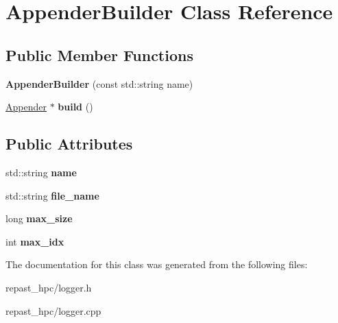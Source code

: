 \hypertarget{class_appender_builder}{\section{Appender\-Builder Class Reference}
\label{class_appender_builder}
}
\subsection*{Public Member Functions}
\begin{DoxyCompactItemize}
\item 
\hypertarget{class_appender_builder_a54ef7bfe2a4bc324957ef673be25ee82}{{\bfseries Appender\-Builder} (const std\-::string name)}\label{class_appender_builder_a54ef7bfe2a4bc324957ef673be25ee82}

\item 
\hypertarget{class_appender_builder_a8f0364cb9215568f44ce573cd8b9b3f0}{\hyperlink{class_appender}{Appender} $\ast$ {\bfseries build} ()}\label{class_appender_builder_a8f0364cb9215568f44ce573cd8b9b3f0}

\end{DoxyCompactItemize}
\subsection*{Public Attributes}
\begin{DoxyCompactItemize}
\item 
\hypertarget{class_appender_builder_ad6d1b5b3182271c7f4dd218b53f7a085}{std\-::string {\bfseries name}}\label{class_appender_builder_ad6d1b5b3182271c7f4dd218b53f7a085}

\item 
\hypertarget{class_appender_builder_a93c3125ddcbec42cd549b39cb856761e}{std\-::string {\bfseries file\-\_\-name}}\label{class_appender_builder_a93c3125ddcbec42cd549b39cb856761e}

\item 
\hypertarget{class_appender_builder_a04ea0440c189ddf1b1e150be593878b8}{long {\bfseries max\-\_\-size}}\label{class_appender_builder_a04ea0440c189ddf1b1e150be593878b8}

\item 
\hypertarget{class_appender_builder_a30816a915e8878a0af244ee45705a4cc}{int {\bfseries max\-\_\-idx}}\label{class_appender_builder_a30816a915e8878a0af244ee45705a4cc}

\end{DoxyCompactItemize}


The documentation for this class was generated from the following files\-:\begin{DoxyCompactItemize}
\item 
repast\-\_\-hpc/logger.\-h\item 
repast\-\_\-hpc/logger.\-cpp\end{DoxyCompactItemize}
